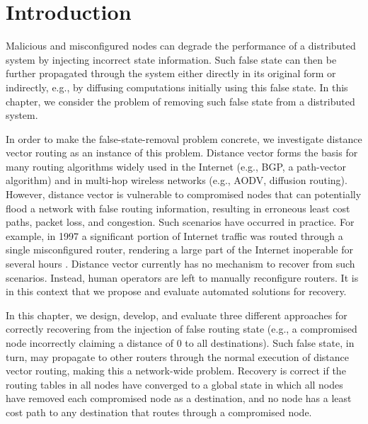 
\section{Introduction}
\label{sec:intro}


Malicious and misconfigured nodes can degrade the performance of a distributed system by injecting incorrect state information. Such false state can then be further propagated 
through the system either directly in its original form or indirectly, e.g., by diffusing computations initially using this false state.  In this chapter, we consider 
the problem of removing such false state from a distributed system.

In order to make the false-state-removal problem concrete, we investigate distance vector routing as an instance of this problem. Distance vector forms the basis for many routing 
algorithms widely used in the Internet (e.g., BGP, a path-vector algorithm) and in multi-hop wireless networks (e.g., AODV, diffusion routing). However, distance vector is vulnerable 
to compromised nodes that can potentially flood a network with false routing information, resulting in erroneous least cost paths, packet loss, and congestion. Such scenarios have occurred in practice. 
For example, in 1997 a significant portion of Internet traffic was routed through a single misconfigured router, rendering a large part of the Internet inoperable for several hours \cite{Neumann97}. 
Distance vector currently has no mechanism to recover from such scenarios. Instead, human operators are left to manually reconfigure routers. It is in this context that we propose and
evaluate automated solutions for recovery.

In this chapter, we design, develop, and evaluate three different approaches for correctly recovering from the injection of false routing state (e.g., a compromised node incorrectly
claiming a distance of $0$ to all destinations). Such false state, in turn, may propagate to other routers through the normal execution of distance vector routing, making this
a network-wide problem. Recovery is correct if the routing tables in all nodes have converged to a global state in which all nodes have removed each compromised node as a destination,
and no node has a least cost path to any destination that routes through a compromised node.

